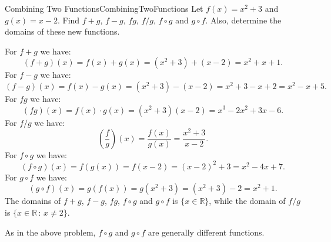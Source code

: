 \begin{example}{Combining Two Functions}{CombiningTwoFunctions}
Let $f(x)=x^2+3$ and $g(x)=x-2$.
Find $f+g$, $f-g$, $fg$, $f/g$, $f\circ g$ and $g\circ f$.
Also, determine the domains of these new functions.
\end{example}

\begin{solution} 
For $f+g$ we have:
$$(f+g)(x)=f(x)+g(x)=(x^2+3)+(x-2)=x^2+x+1.$$
For $f-g$ we have:
$$(f-g)(x)=f(x)-g(x)=(x^2+3)-(x-2)=x^2+3-x+2=x^2-x+5.$$
For $fg$ we have:
$$(fg)(x)=f(x)\cdot g(x)=(x^2+3)(x-2)=x^3-2x^2+3x-6.$$
For $f/g$ we have:
$$\left(\frac{f}{g}\right)(x)=\frac{f(x)}{g(x)}=\frac{x^2+3}{x-2}.$$
For $f\circ g$ we have:
$$(f\circ g)(x)=f(g(x))=f(x-2)=(x-2)^2+3=x^2-4x+7.$$
For $g\circ f$ we have:
$$(g\circ f)(x)=g(f(x))=g(x^2+3)=(x^2+3)-2=x^2+1.$$
The domains of $f+g$, $f-g$, $fg$, $f\circ g$ and $g\circ f$ is $\{x\in\mathbb{R}\}$, while the domain of $f/g$ is $\{x\in\mathbb{R}\,:\,x\neq 2\}$.
\end{solution}

As in the above problem, $f\circ g$ and $g\circ f$ are generally different functions.